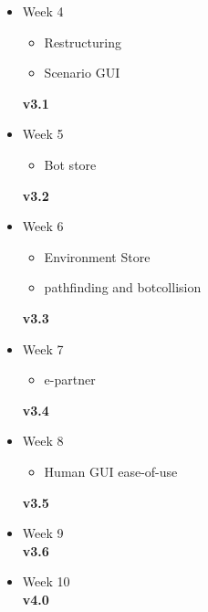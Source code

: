 \begin{itemize}
	\item Week 4
	\begin{itemize}
	\item Restructuring
	\item	Scenario GUI
\end{itemize}
	\textbf{v3.1}
	\item Week 5
	\begin{itemize}
	\item Bot store
\end{itemize}
	\textbf{v3.2}
	\item Week 6
	\begin{itemize}
	\item Environment Store
	\item	\gls{pathfinding} and botcollision
\end{itemize}
	\textbf{v3.3}
	\item Week 7
	\begin{itemize}
	\item \gls{e-partner}
\end{itemize}
	\textbf{v3.4}
	\item Week 8
	\begin{itemize}
	\item Human GUI ease-of-use
\end{itemize}
	\textbf{v3.5}
	\item Week 9 \\
	\textbf{v3.6}
	\item Week 10 \\
	\textbf{v4.0}
\end{itemize}
